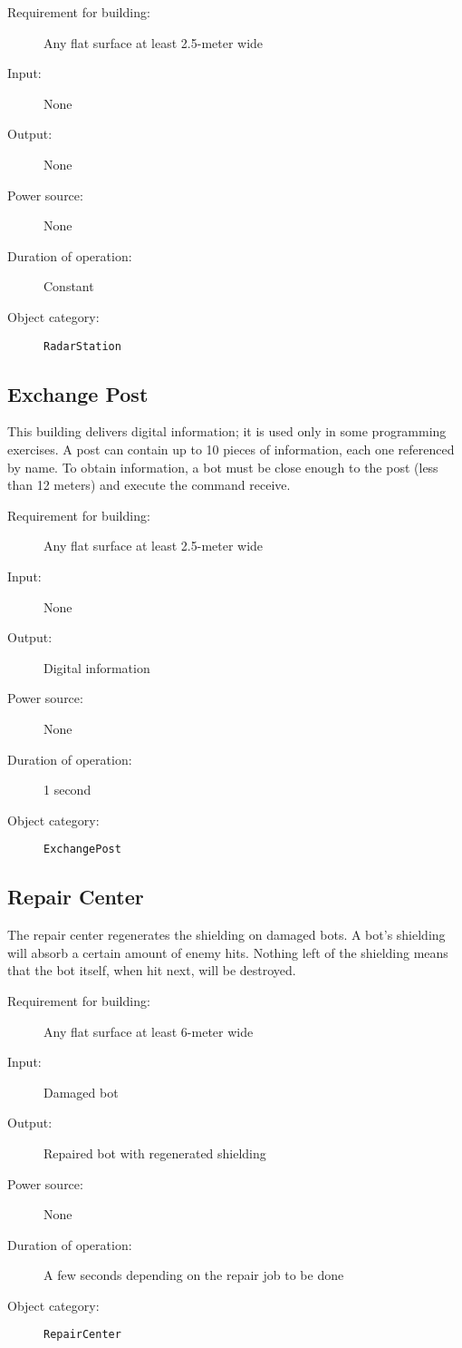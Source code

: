 \begin{description}
    \item[Requirement for building:] Any flat surface at least 2.5-meter wide
    \item[Input:] None
    \item[Output:] None
    \item[Power source:] None
    \item[Duration of operation:] Constant
    \item[Object category:] \texttt{RadarStation}
\end{description}


\subsection{Exchange Post}

This building delivers digital information; it is used only in some programming exercises. A post can contain up to 10 pieces of information, each one referenced by name. To obtain information, a bot must be close enough to the post (less than 12 meters) and execute the command receive.

\begin{description}
    \item[Requirement for building:] Any flat surface at least 2.5-meter wide
    \item[Input:] None
    \item[Output:] Digital information
    \item[Power source:] None
    \item[Duration of operation:] 1 second
    \item[Object category:] \texttt{ExchangePost}
\end{description}


\subsection{Repair Center}

The repair center regenerates the shielding on damaged bots. A bot's shielding will absorb a certain amount of enemy hits. Nothing left of the shielding means that the bot itself, when hit next, will be destroyed.

\begin{description}
    \item[Requirement for building:] Any flat surface at least 6-meter wide
    \item[Input:] Damaged bot
    \item[Output:] Repaired bot with regenerated shielding
    \item[Power source:] None
    \item[Duration of operation:] A few seconds depending on the repair job to be done
    \item[Object category:] \texttt{RepairCenter}
\end{description}


